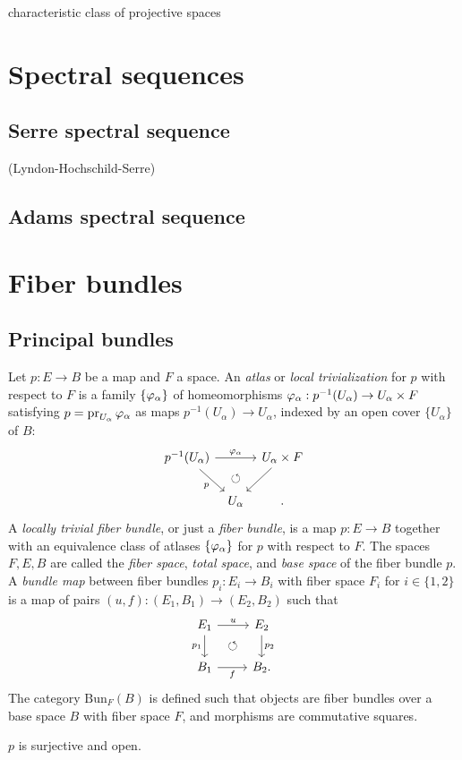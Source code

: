 \documentclass{../../large}
\begin{document}
characteristic class of projective spaces





\chapter{Spectral sequences}
\section{Serre spectral sequence}
	(Lyndon-Hochschild-Serre)
\section{Adams spectral sequence}






\chapter{Fiber bundles}


\section{Principal bundles}

\begin{prb}
Let $p:E\to B$ be a map and $F$ a space.
An \emph{atlas} or \emph{local trivialization} for $p$ with respect to $F$ is a family $\{\varphi_\alpha\}$ of homeomorphisms $\varphi_\alpha:p^{-1}(U_\alpha)\to U_\alpha\times F$ satisfying $p=\operatorname{pr}_{U_\alpha}\varphi_\alpha$ as maps $p^{-1}(U_\alpha)\to U_\alpha$, indexed by an open cover $\{U_\alpha\}$ of $B$: 
\[\begin{tikzcd}[column sep=tiny]
p^{-1}(U_\alpha) \ar[swap]{dr}{p}\ar{rr}{\f_\alpha} & \, & U_\alpha\times F \ar{dl} \\
& U_\alpha \uar[phantom]{\circlearrowleft} &.
\end{tikzcd}\]
A \emph{locally trivial fiber bundle}, or just a \emph{fiber bundle}, is a map $p:E\to B$ together with an equivalence class of atlases $\{\varphi_\alpha\}$ for $p$ with respect to $F$.
The spaces $F,E,B$ are called the \emph{fiber space}, \emph{total space}, and \emph{base space} of the fiber bundle $p$.
A \emph{bundle map} between fiber bundles $p_i:E_i\to B_i$ with fiber space $F_i$ for $i\in\{1,2\}$ is a map of pairs $(u,f):(E_1,B_1)\to(E_2,B_2)$ such that
\[\begin{tikzcd}
E_1 \ar[swap]{d}{p_1}\ar{r}{u}\ar[phantom]{dr}{\circlearrowleft} & E_2 \ar{d}{p_2} \\
B_1 \ar[swap]{r}{f} & B_2.
\end{tikzcd}\]
The category $\mathrm{Bun}_F(B)$ is defined such that objects are fiber bundles over a base space $B$ with fiber space $F$, and morphisms are commutative squares.
\begin{parts}
\item $p$ is surjective and open.
\end{parts}
\end{prb}
\end{document}
